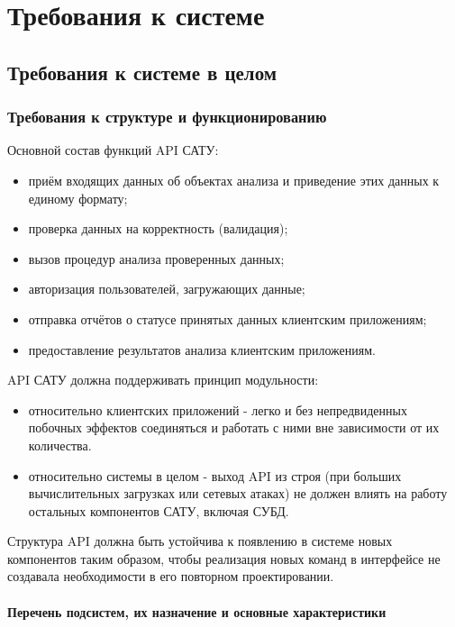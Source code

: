 \chapter{Требования к системе}

\section{Требования к системе в целом}

\subsection{Требования к структуре и функционированию}

\par
	Основной состав функций API САТУ:

	\begin{itemize}
		\item приём входящих данных об объектах анализа и приведение этих данных к единому формату;
		\item проверка данных на корректность (валидация);
		\item вызов процедур анализа проверенных данных;
		\item авторизация пользователей, загружающих данные;
		\item отправка отчётов о статусе принятых данных клиентским приложениям;
		\item предоставление результатов анализа клиентским приложениям.
	\end{itemize}
	
	API САТУ должна поддерживать принцип модульности:

	\begin{itemize}
		\item относительно клиентских приложений - легко и без непредвиденных побочных эффектов соединяться и работать с ними вне зависимости от их количества. 
		\item относительно системы в целом - выход API из строя (при больших вычислительных загрузках или сетевых атаках) не должен влиять на работу остальных компонентов САТУ, включая СУБД.
	\end{itemize}
 
	Структура API должна быть устойчива к появлению в системе новых компонентов таким образом, чтобы реализация новых команд в интерфейсе не создавала необходимости в его повторном проектировании.

\subsubsection{Перечень подсистем, их назначение и основные характеристики}

